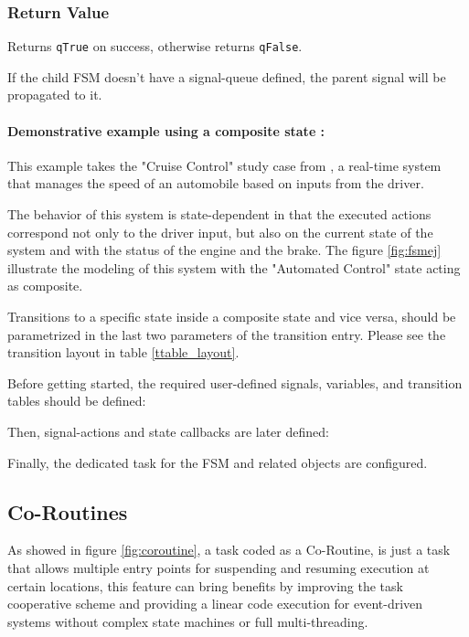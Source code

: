 \subsubsection*{Return Value}
Returns \lstinline{qTrue} on success, otherwise returns \lstinline{qFalse}.

\hrulefill
\medskip

\begin{tcolorbox}
\HandRight If the child FSM doesn't have a signal-queue defined, the parent signal will be propagated to it.
\end{tcolorbox}


\paragraph{Demonstrative example using a composite state :} This example takes the "Cruise Control" study case from \cite{gomaa}, a real-time system that manages the speed of an automobile based on inputs from the driver. 



The behavior of this system is state-dependent in that the executed actions correspond not only to the driver input, but also on the current state of the system and with the status of the engine and the brake. 
The figure \ref{fig:fsmej} illustrate the modeling of this system with the "Automated Control" state acting as composite.
\medskip

\begin{tcolorbox}
\HandRight Transitions to a specific state inside a composite state and vice versa, should be parametrized in the last two parameters of the transition entry. Please see the transition layout in table \ref{ttable_layout}.
\end{tcolorbox}



Before getting started, the required user-defined signals, variables, and transition tables should be defined:



Then, signal-actions and state callbacks are later defined:



Finally, the dedicated task for the FSM and related objects are configured.



\subsection{Co-Routines}
As showed in figure \ref{fig:coroutine}, a task coded as a Co-Routine, is just a task that allows multiple entry points for suspending and resuming execution at certain locations, this feature can bring benefits by improving the task cooperative scheme and providing a linear code execution for event-driven systems without complex state machines or full multi-threading.
\medskip

